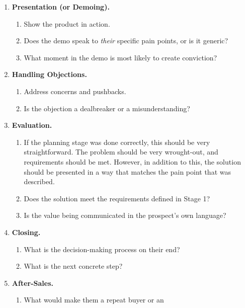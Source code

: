 \begin{enumerate}
    \item \textbf{Presentation (or Demoing).}
    \begin{enumerate}
        \item Show the product in action.
        \item Does the demo speak to \textit{their} specific pain points, or is it generic?
        \item What moment in the demo is most likely to create conviction?
    \end{enumerate}

    \item \textbf{Handling Objections.}
    \begin{enumerate}
        \item Address concerns and pushbacks.
        \item Is the objection a dealbreaker or a misunderstanding?
    \end{enumerate}

    \item \textbf{Evaluation.}
    \begin{enumerate}
        \item If the planning stage was done correctly, this should be very straightforward. The problem should be very wrought-out, and requirements should be met. However, in addition to this, the solution should be presented in a way that matches the pain point that was described.
        \item Does the solution meet the requirements defined in Stage 1?
        \item Is the value being communicated in the prospect's own language?
    \end{enumerate}

    \item \textbf{Closing.}
    \begin{enumerate}
        \item What is the decision-making process on their end?
        \item What is the next concrete step?
    \end{enumerate}

    \item \textbf{After-Sales.}
    \begin{enumerate}
        \item What would make them a repeat buyer or an
    \end{enumerate}

\end{enumerate}